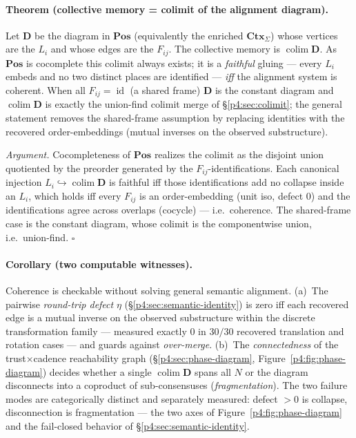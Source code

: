 \documentclass{article}
\begin{document}
\paragraph{Theorem (collective memory = colimit of the alignment diagram).}
Let $\mathbf{D}$ be the diagram in $\mathbf{Pos}$ (equivalently the enriched
$\mathbf{Ctx}_\Sigma$) whose vertices are the $L_i$ and whose edges are the
$F_{ij}$. The collective memory is $\operatorname{colim}\mathbf{D}$. As
$\mathbf{Pos}$ is cocomplete this colimit always exists; it is a \emph{faithful}
gluing --- every $L_i$ embeds and no two distinct places are identified ---
\emph{iff} the alignment system is coherent. When all $F_{ij}=\operatorname{id}$
(a shared frame) $\mathbf{D}$ is the constant diagram and
$\operatorname{colim}\mathbf{D}$ is exactly the union-find colimit merge of
\S\ref{p4:sec:colimit}; the general statement removes the shared-frame assumption
by replacing identities with the recovered order-embeddings (mutual inverses on the observed substructure).

\emph{Argument.} Cocompleteness of $\mathbf{Pos}$ realizes the colimit as the
disjoint union quotiented by the preorder generated by the
$F_{ij}$-identifications. Each canonical injection
$L_i\hookrightarrow\operatorname{colim}\mathbf{D}$ is faithful iff those
identifications add no collapse inside an $L_i$, which holds iff every $F_{ij}$
is an order-embedding (unit iso, defect $0$) and the identifications agree
across overlaps (cocycle) --- i.e.\ coherence. The shared-frame case is the
constant diagram, whose colimit is the componentwise union, i.e.\ union-find.
\hfill$\square$

\paragraph{Corollary (two computable witnesses).} Coherence is checkable
without solving general semantic alignment. (a)~The pairwise \emph{round-trip
defect} $\eta$ (\S\ref{p4:sec:semantic-identity}) is zero iff each recovered edge is a
mutual inverse on the observed substructure within the discrete transformation family
--- measured exactly $0$ in $30/30$ recovered translation and
rotation cases --- and guards against \emph{over-merge}. (b)~The
\emph{connectedness} of the trust$\times$cadence reachability graph
(\S\ref{p4:sec:phase-diagram}, Figure~\ref{p4:fig:phase-diagram}) decides whether a
single $\operatorname{colim}\mathbf{D}$ spans all $N$ or the diagram
disconnects into a coproduct of sub-consensuses (\emph{fragmentation}). The two
failure modes are categorically distinct and separately measured: defect $>0$
is collapse, disconnection is fragmentation --- the two axes of
Figure~\ref{p4:fig:phase-diagram} and the fail-closed behavior of
\S\ref{p4:sec:semantic-identity}.
\end{document}

